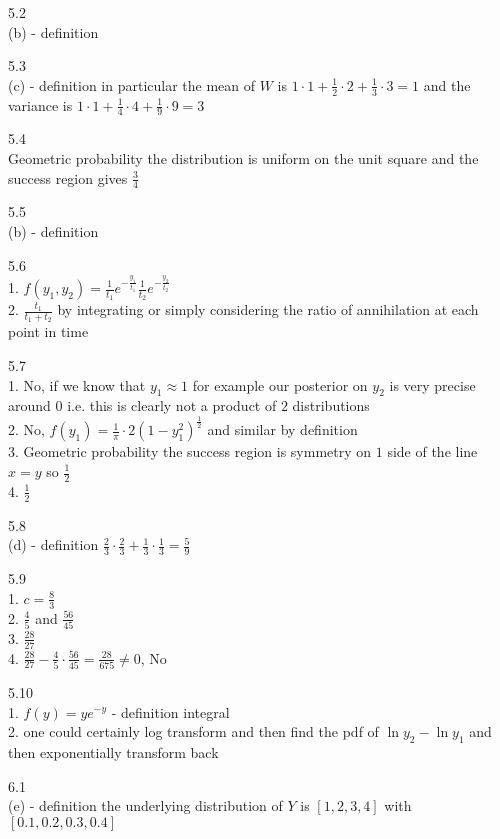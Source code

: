 5.2 \\
(b) - definition

5.3 \\
(c) - definition in particular the mean of $W$ is $1\cdot 1+\frac{1}{2}\cdot 2+\frac{1}{3}\cdot 3=1$ and the variance is $1\cdot 1+\frac{1}{4}\cdot 4+\frac{1}{9}\cdot 9=3$

5.4 \\
Geometric probability the distribution is uniform on the unit square and the success region gives $\frac{3}{4}$

5.5 \\
(b) - definition

5.6 \\
1. $f(y_1,y_2)=\frac{1}{t_1}e^{-\frac{y_1}{t_1}} \frac{1}{t_2}e^{-\frac{y_2}{t_2}}$ \\
2. $\frac{t_1}{t_1+t_2}$ by integrating or simply considering the ratio of annihilation at each point in time

5.7 \\
1. No, if we know that $y_1\approx 1$ for example our posterior on $y_2$ is very precise around $0$ i.e. this is clearly not a product of $2$ distributions \\
2. No, $f(y_1)=\frac{1}{\pi} \cdot 2(1-y_1^2)^{\frac{1}{2}}$ and similar by definition \\
3. Geometric probability the success region is symmetry on $1$ side of the line $x=y$ so $\frac{1}{2}$ \\
4. $\frac{1}{2}$

5.8 \\
(d) - definition $\frac{2}{3}\cdot \frac{2}{3}+\frac{1}{3}\cdot \frac{1}{3}=\frac{5}{9}$

5.9 \\
1. $c=\frac{8}{3}$ \\
2. $\frac{4}{5}$ and $\frac{56}{45}$ \\
3. $\frac{28}{27}$ \\
4. $\frac{28}{27}-\frac{4}{5}\cdot\frac{56}{45}=\frac{28}{675}\neq 0$, No

5.10 \\
1. $f(y)=ye^{-y}$ - definition integral\\
2. one could certainly log transform and then find the pdf of $\ln{y_2}-\ln{y_1}$ and then exponentially transform back

\newpage

6.1 \\
(e) - definition the underlying distribution of $Y$ is $[1,2,3,4]$ with $[0.1,0.2,0.3,0.4]$


